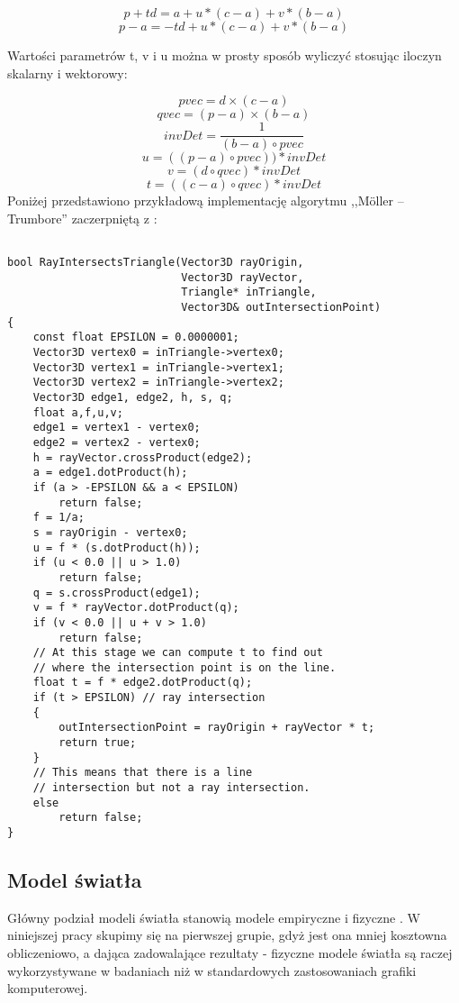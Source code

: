 $$p + td = a + u * (c - a) + v * (b - a)$$
$$p - a = -td + u * (c - a) + v * (b - a)$$

Wartości parametrów t, v i u można w prosty sposób wyliczyć stosując iloczyn skalarny i wektorowy:

$$pvec = d \times (c - a)$$
$$qvec = (p - a) \times (b - a)$$
$$invDet = \frac{1}{(b - a) \circ pvec}$$
$$u = ((p - a) \circ pvec)) * invDet$$
$$v = (d \circ qvec) * invDet$$
$$t = ((c - a) \circ qvec) * invDet$$
Poniżej przedstawiono przykładową implementację algorytmu ,,Möller – Trumbore'' zaczerpniętą z \cite{wikiMoll}:

\begin{lstlisting}[caption={Algorytm \emph{Möller – Trumbore}}]

bool RayIntersectsTriangle(Vector3D rayOrigin, 
                           Vector3D rayVector, 
                           Triangle* inTriangle,
                           Vector3D& outIntersectionPoint)
{
    const float EPSILON = 0.0000001; 
    Vector3D vertex0 = inTriangle->vertex0;
    Vector3D vertex1 = inTriangle->vertex1;  
    Vector3D vertex2 = inTriangle->vertex2;
    Vector3D edge1, edge2, h, s, q;
    float a,f,u,v;
    edge1 = vertex1 - vertex0;
    edge2 = vertex2 - vertex0;
    h = rayVector.crossProduct(edge2);
    a = edge1.dotProduct(h);
    if (a > -EPSILON && a < EPSILON)
        return false;
    f = 1/a;
    s = rayOrigin - vertex0;
    u = f * (s.dotProduct(h));
    if (u < 0.0 || u > 1.0)
        return false;
    q = s.crossProduct(edge1);
    v = f * rayVector.dotProduct(q);
    if (v < 0.0 || u + v > 1.0)
        return false;
    // At this stage we can compute t to find out
    // where the intersection point is on the line.
    float t = f * edge2.dotProduct(q);
    if (t > EPSILON) // ray intersection
    {
        outIntersectionPoint = rayOrigin + rayVector * t; 
        return true;
    }
    // This means that there is a line
    // intersection but not a ray intersection.
    else 
        return false;
}

\end{lstlisting}



\subsection{Model światła}

Główny podział modeli światła stanowią modele empiryczne i fizyczne \cite{suffern2007, falski2004}. W niniejszej pracy skupimy się na pierwszej grupie, gdyż jest ona mniej kosztowna obliczeniowo, a dająca zadowalające rezultaty - fizyczne modele światła są raczej wykorzystywane w badaniach niż w standardowych zastosowaniach grafiki komputerowej.


